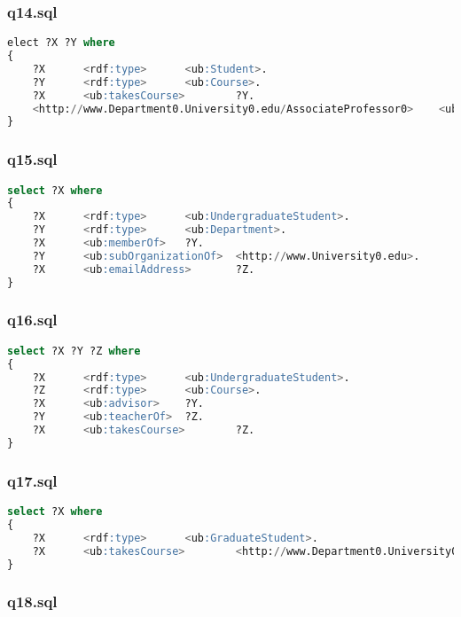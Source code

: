 \documentclass[titlepage, a4paper, 12pt] {article}
\begin{document}
\subsubsection{q14.sql}

\begin{lstlisting}[language=SQL]
elect ?X ?Y where
{
	?X      <rdf:type>      <ub:Student>.
	?Y      <rdf:type>      <ub:Course>.
	?X      <ub:takesCourse>        ?Y.
	<http://www.Department0.University0.edu/AssociateProfessor0>    <ub:teacherOf>  ?Y.
}
\end{lstlisting}

\subsubsection{q15.sql}

\begin{lstlisting}[language=SQL]
select ?X where
{
	?X      <rdf:type>      <ub:UndergraduateStudent>.
	?Y      <rdf:type>      <ub:Department>.
	?X      <ub:memberOf>   ?Y.
	?Y      <ub:subOrganizationOf>  <http://www.University0.edu>.
	?X      <ub:emailAddress>       ?Z.
}
\end{lstlisting}

\subsubsection{q16.sql}

\begin{lstlisting}[language=SQL]
select ?X ?Y ?Z where
{
	?X      <rdf:type>      <ub:UndergraduateStudent>.
	?Z      <rdf:type>      <ub:Course>.
	?X      <ub:advisor>    ?Y.
	?Y      <ub:teacherOf>  ?Z.
	?X      <ub:takesCourse>        ?Z.
}
\end{lstlisting}

\subsubsection{q17.sql}

\begin{lstlisting}[language=SQL]
select ?X where
{
	?X      <rdf:type>      <ub:GraduateStudent>.
	?X      <ub:takesCourse>        <http://www.Department0.University0.edu/GraduateCourse0>.
}
\end{lstlisting}

\subsubsection{q18.sql}
\end{document}
